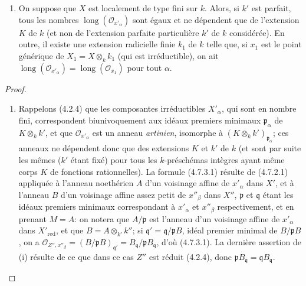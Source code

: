 \begin{proposition}[4.7.3]
\begin{enumerate}
\item[\textup{(iii)}] On suppose que $X$ est localement de type fini sur $k$. Alors,
si $k'$ est parfait, tous les nombres
$\operatorname{long}(\mathcal O_{x'_\alpha})$ sont égaux et ne dépendent que
de l'extension $K$ de $k$ \textup{(et non de l'extension parfaite particulière $k'$
de $k$ considérée)}. En outre, il existe une extension radicielle finie $k_1$
de $k$ telle que, si $x_1$ est le point générique de
$X_1=X\otimes_k k_1$ (qui est irréductible), on ait
$\operatorname{long}(\mathcal O_{x'_\alpha})
=\operatorname{long}(\mathcal O_{x_1})$ pour tout $\alpha$.
\end{enumerate}
\end{proposition}

\begin{proof}
\begin{enumerate}
\item[(i)] Rappelons (4.2.4) que les composantes irréductibles $X'_\alpha$,
qui sont en nombre fini, correspondent biunivoquement aux idéaux premiers
minimaux $\mathfrak p_\alpha$ de $K\otimes_k k'$, et que
$\mathcal O_{x'_\alpha}$ est un anneau \emph{artinien}, isomorphe à
$(K\otimes_k k')_{\mathfrak p_\alpha}$; ces anneaux ne dépendent donc que des
extensions $K$ et $k'$ de $k$ (et sont par suite les mêmes ($k'$ étant fixé)
pour tous les $k$-préschémas intègres ayant même corps $K$ de fonctions
rationnelles). La formule (4.7.3.1) résulte de (4.7.2.1) appliquée à l'anneau
noethérien $A$ d'un voisinage affine de $x'_\alpha$ dans $X'$, et à l'anneau
$B$ d'un voisinage affine assez petit de $x''_\beta$ dans $X''$, $\mathfrak p$
et $\mathfrak q$ étant les idéaux premiers minimaux correspondant à
$x'_\alpha$ et $x''_\beta$ respectivement, et en prenant $M=A$: on notera que
$A/\mathfrak p$ est l'anneau d'un voisinage affine de $x'_\alpha$ dans
$X'_{\mathrm{red}}$, et que $B=A\otimes_{k'}k''$; si
$\mathfrak q'=\mathfrak q/\mathfrak pB$, idéal premier minimal de
$B/\mathfrak pB$, on a
$\mathcal O_{Z'',x''_\beta}
=(B/\mathfrak pB)_{\mathfrak q'}
=B_{\mathfrak q}/\mathfrak pB_{\mathfrak q}$,
d'où (4.7.3.1). La dernière assertion de (i) résulte de ce que dans ce cas
$Z''$ est réduit (4.2.4), donc
$\mathfrak pB_{\mathfrak q}=\mathfrak qB_{\mathfrak q}$.


\end{enumerate}
\end{proof}
